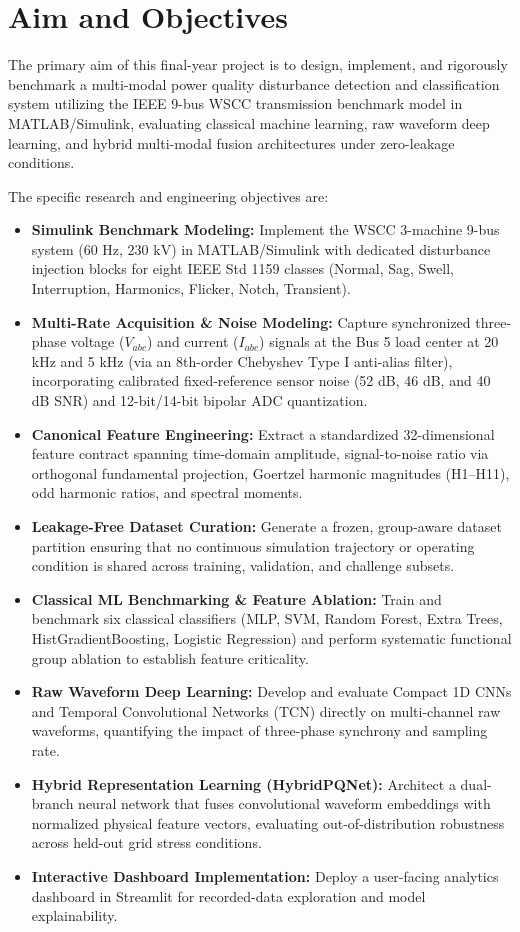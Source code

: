 \documentclass[12pt,a4paper]{report}
\begin{document}
\section{Aim and Objectives}
The primary aim of this final-year project is to design, implement, and rigorously benchmark a multi-modal power quality disturbance detection and classification system utilizing the IEEE 9-bus WSCC transmission benchmark model in MATLAB/Simulink, evaluating classical machine learning, raw waveform deep learning, and hybrid multi-modal fusion architectures under zero-leakage conditions.

The specific research and engineering objectives are:
\begin{itemize}
    \item \textbf{Simulink Benchmark Modeling:} Implement the WSCC 3-machine 9-bus system ($60\text{ Hz}$, $230\text{ kV}$) in MATLAB/Simulink with dedicated disturbance injection blocks for eight IEEE Std 1159 classes (Normal, Sag, Swell, Interruption, Harmonics, Flicker, Notch, Transient).
    \item \textbf{Multi-Rate Acquisition \& Noise Modeling:} Capture synchronized three-phase voltage ($V_{abc}$) and current ($I_{abc}$) signals at the Bus 5 load center at 20 kHz and 5 kHz (via an 8th-order Chebyshev Type I anti-alias filter), incorporating calibrated fixed-reference sensor noise (52 dB, 46 dB, and 40 dB SNR) and 12-bit/14-bit bipolar ADC quantization.
    \item \textbf{Canonical Feature Engineering:} Extract a standardized 32-dimensional feature contract spanning time-domain amplitude, signal-to-noise ratio via orthogonal fundamental projection, Goertzel harmonic magnitudes (H1--H11), odd harmonic ratios, and spectral moments.
    \item \textbf{Leakage-Free Dataset Curation:} Generate a frozen, group-aware dataset partition ensuring that no continuous simulation trajectory or operating condition is shared across training, validation, and challenge subsets.
    \item \textbf{Classical ML Benchmarking \& Feature Ablation:} Train and benchmark six classical classifiers (MLP, SVM, Random Forest, Extra Trees, HistGradientBoosting, Logistic Regression) and perform systematic functional group ablation to establish feature criticality.
    \item \textbf{Raw Waveform Deep Learning:} Develop and evaluate Compact 1D CNNs and Temporal Convolutional Networks (TCN) directly on multi-channel raw waveforms, quantifying the impact of three-phase synchrony and sampling rate.
    \item \textbf{Hybrid Representation Learning (HybridPQNet):} Architect a dual-branch neural network that fuses convolutional waveform embeddings with normalized physical feature vectors, evaluating out-of-distribution robustness across held-out grid stress conditions.
    \item \textbf{Interactive Dashboard Implementation:} Deploy a user-facing analytics dashboard in Streamlit for recorded-data exploration and model explainability.
\end{itemize}
\end{document}
